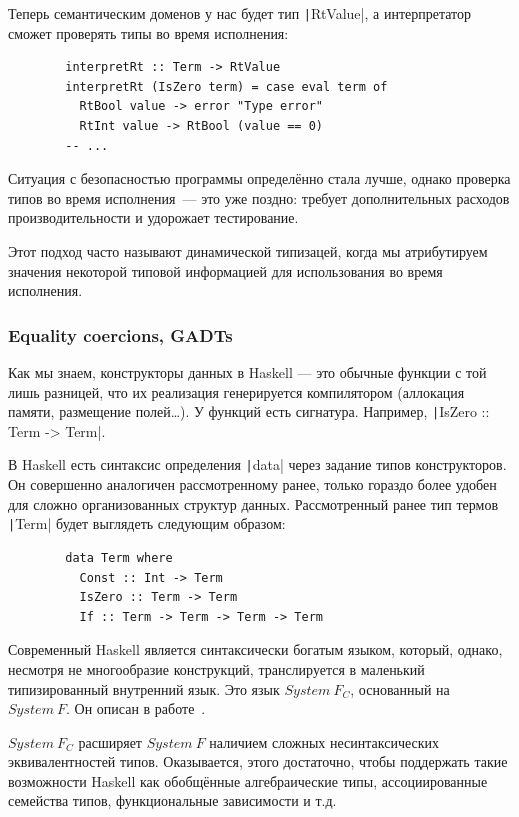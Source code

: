 \documentclass[12pt]{article}
\begin{document}
    Теперь семантическим доменов у нас будет тип \texttt|RtValue|, а интерпретатор сможет проверять типы во время исполнения:
    \begin{verbatim}
        interpretRt :: Term -> RtValue
        interpretRt (IsZero term) = case eval term of
          RtBool value -> error "Type error"
          RtInt value -> RtBool (value == 0)
        -- ...
    \end{verbatim}

    Ситуация с безопасностью программы определённо стала лучше, однако проверка типов во время исполнения~--- это уже поздно: требует дополнительных расходов производительности и удорожает тестирование.

    Этот подход часто называют динамической типизацей, когда мы атрибутируем значения некоторой типовой информацией для использования во время исполнения.

    \subsubsection{Equality coercions, GADTs}

    Как мы знаем, конструкторы данных в Haskell --- это обычные функции с той лишь разницей, что их реализация генерируется компилятором (аллокация памяти, размещение полей\ldots).
    У функций есть сигнатура.
    Например, \texttt|IsZero :: Term -> Term|.

    В Haskell есть синтаксис определения \texttt|data| через задание типов конструкторов.
    Он совершенно аналогичен рассмотренному ранее, только гораздо более удобен для сложно организованных структур данных.
    Рассмотренный ранее тип термов \texttt|Term| будет выглядеть следующим образом:
    \begin{verbatim}
        data Term where
          Const :: Int -> Term
          IsZero :: Term -> Term
          If :: Term -> Term -> Term -> Term
    \end{verbatim}

    Современный Haskell является синтаксически богатым языком, который, однако, несмотря не многообразие конструкций, транслируется в маленький типизированный внутренний язык.
    Это язык $System~F_C$, основанный на $System~F$.
    Он описан в работе~\cite{sulzmann2007system}.

    $System~F_C$ расширяет $System~F$ наличием сложных несинтаксических эквивалентностей типов.
    Оказывается, этого достаточно, чтобы поддержать такие возможности Haskell как обобщённые алгебраические типы, ассоциированные семейства типов, функциональные зависимости и т.д.
\end{document}
